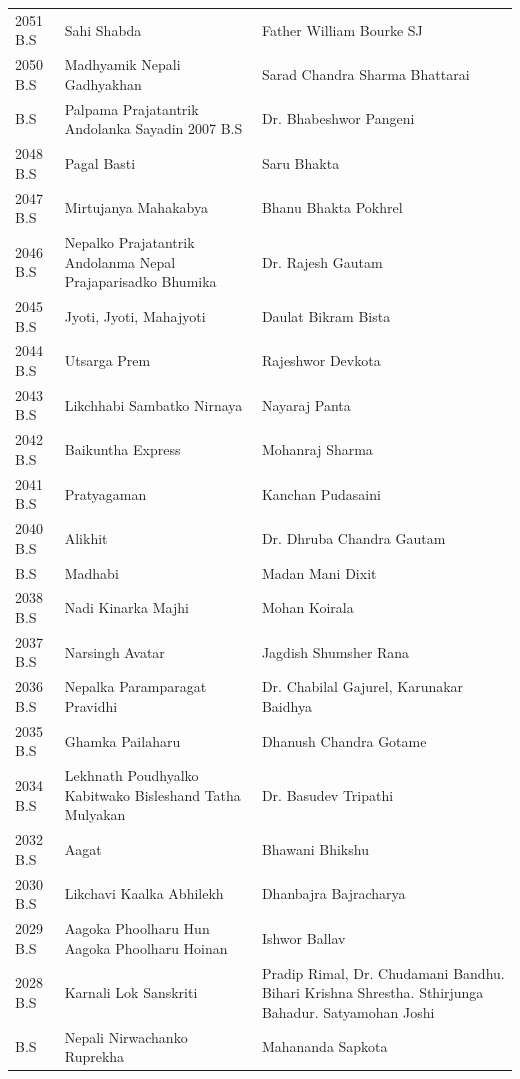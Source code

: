 \documentclass[
  openany]{book}
\begin{document}
\begin{longtable}[t]{l>{\raggedright\arraybackslash}p{14em}>{\raggedright\arraybackslash}p{24em}}
2051 B.S & Sahi Shabda & Father William Bourke SJ\\
\rowcolor{gray!6}  2050 B.S & Madhyamik Nepali Gadhyakhan & Sarad Chandra Sharma Bhattarai\\
\addlinespace
2049 B.S & Palpama Prajatantrik Andolanka Sayadin 2007 B.S & Dr. Bhabeshwor Pangeni\\
\rowcolor{gray!6}  2048 B.S & Pagal Basti & Saru Bhakta\\
2047 B.S & Mirtujanya Mahakabya & Bhanu Bhakta Pokhrel\\
\rowcolor{gray!6}  2046 B.S & Nepalko Prajatantrik Andolanma Nepal Prajaparisadko Bhumika & Dr. Rajesh Gautam\\
2045 B.S & Jyoti, Jyoti, Mahajyoti & Daulat Bikram Bista\\
\addlinespace
\rowcolor{gray!6}  2044 B.S & Utsarga Prem & Rajeshwor Devkota\\
2043 B.S & Likchhabi Sambatko Nirnaya & Nayaraj Panta\\
\rowcolor{gray!6}  2042 B.S & Baikuntha Express & Mohanraj Sharma\\
2041 B.S & Pratyagaman & Kanchan Pudasaini\\
\rowcolor{gray!6}  2040 B.S & Alikhit & Dr. Dhruba Chandra Gautam\\
\addlinespace
2039 B.S & Madhabi & Madan Mani Dixit\\
\rowcolor{gray!6}  2038 B.S & Nadi Kinarka Majhi & Mohan Koirala\\
2037 B.S & Narsingh Avatar & Jagdish Shumsher Rana\\
\rowcolor{gray!6}  2036 B.S & Nepalka Paramparagat Pravidhi & Dr. Chabilal Gajurel, Karunakar Baidhya\\
2035 B.S & Ghamka Pailaharu & Dhanush Chandra Gotame\\
\addlinespace
\rowcolor{gray!6}  2034 B.S & Lekhnath Poudhyalko Kabitwako Bisleshand Tatha Mulyakan & Dr. Basudev Tripathi\\
2032 B.S & Aagat & Bhawani Bhikshu\\
\rowcolor{gray!6}  2030 B.S & Likchavi Kaalka Abhilekh & Dhanbajra Bajracharya\\
2029 B.S & Aagoka Phoolharu Hun Aagoka Phoolharu Hoinan & Ishwor Ballav\\
\rowcolor{gray!6}  2028 B.S & Karnali Lok Sanskriti & Pradip Rimal, Dr. Chudamani Bandhu. Bihari Krishna Shrestha. Sthirjunga Bahadur. Satyamohan Joshi\\
\addlinespace
2027 B.S & Nepali Nirwachanko Ruprekha & Mahananda Sapkota\\

\end{longtable}
\end{document}
